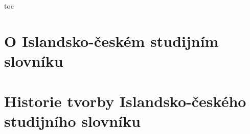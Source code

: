 




\onecolumn
\pagestyle{basicstyle}

\makecover\frontcoverimages

\cleardoublepage
\begin{center}
  \vspace*{2cm}
  {\fontsize{20}{20}\selectfont\scshape%
    \dictnameCZ\\\dictnameIS}
\end{center}

\cleardoublepage
\begin{center}
  \vspace*{2cm}
  {\fontsize{24}{24}\selectfont\scshape%
    \dictnameCZ\\\dictnameIS}
\end{center}

\clearpage


\pdfbookmark\contentsname{toc}    
\tableofcontents
{}

\chapter{O Islandsko-českém studijním slovníku}


\chapter{Historie tvorby Islandsko-českého studijního slovníku}


\twocolumn
\pagestyle{basicstyle}

